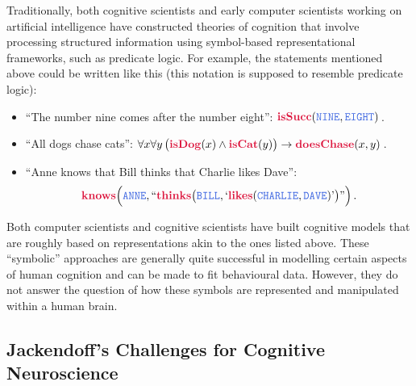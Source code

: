 \documentclass[10pt,letterpaper,oneside]{article}
\begin{document}
Traditionally, both cognitive scientists and early computer scientists working on artificial intelligence have constructed theories of cognition that involve processing structured information using symbol-based representational frameworks, such as predicate logic. For example, the statements mentioned above could be written like this (this notation is supposed to resemble predicate logic):
\newcommand{\Pred}[1]{\mathbf{\textcolor{Crimson}{#1}}}
\newcommand{\Obj}[1]{\mathtt{\textcolor{RoyalBlue}{#1}}}
\newcommand{\Fun}[1]{\mathit{\textcolor{ForestGreen}{#1}}}
\begin{itemize}
	\item \enquote{The number nine comes after the number eight}: $\Pred{isSucc}(\Obj{NINE}, \Obj{EIGHT})\,$.
	\item \enquote{All dogs chase cats}: $\forall x \forall y \, \big ( \Pred{isDog}(x) \wedge \Pred{isCat}(y) \big) \rightarrow \Pred{doesChase}(x, y)\,$.
	\item \enquote{Anne knows that Bill thinks that Charlie likes Dave}:$$\Pred{knows}\Big(\Obj{ANNE}, ``\Pred{thinks}\big(\Obj{BILL}, `\Pred{likes}(\Obj{CHARLIE}, \Obj{DAVE})\text{'}\big)\text{''}\Big)\,.$$
\end{itemize}
Both computer scientists and cognitive scientists have built cognitive models that are roughly based on representations akin to the ones listed above. These \enquote{symbolic} approaches are generally quite successful in modelling certain aspects of human cognition and can be made to fit behavioural data. However, they do not answer the question of how these symbols are represented and manipulated within a human brain.

\subsection{Jackendoff's Challenges for Cognitive Neuroscience}
\end{document}
